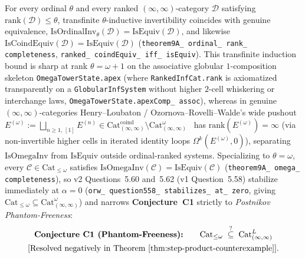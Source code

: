 \begin{theorem}[Ordinal-Rank Completeness and Stabilization of ORW Question~5.58 at $\alpha = 0$]\label{thm:ordinal-rank-completeness}%
%
%
For every ordinal $\theta$ and every ranked $(\infty, \infty)$-category $\mathcal{D}$ satisfying $\mathrm{rank}(\mathcal{D}) \le \theta$, transfinite $\theta$-inductive invertibility coincides with genuine equivalence, $\mathrm{IsOrdinalInv}_\theta(\mathcal{D}) = \mathrm{IsEquiv}(\mathcal{D})$, and likewise $\mathrm{IsCoindEquiv}(\mathcal{D}) = \mathrm{IsEquiv}(\mathcal{D})$ (\texttt{theorem9A\_ ordinal\_ rank\_ completeness}, \texttt{ranked\_ coindEquiv\_ iff\_ isEquiv}). This transfinite induction bound is sharp at rank $\theta = \omega + 1$ on the associative globular $1$-composition skeleton \texttt{OmegaTowerState.apex} (where \texttt{RankedInfCat.rank} is axiomatized transparently on a \texttt{GlobularInfSystem} without higher $2$-cell whiskering or interchange laws, \texttt{OmegaTowerState.apexComp\_ assoc}), whereas in genuine $(\infty, \infty)$-categories Henry--Loubaton / Ozornova--Rovelli--Walde's wide pushout $E^{(\omega)} := \bigsqcup_{n \ge 1,\, [1]} E^{(n)} \in \mathrm{Cat}^{\mathrm{coind}}_{(\infty,\infty)} \setminus \mathrm{Cat}^\omega_{(\infty,\infty)}$~\cite{HenryLoubaton25,ORW26} has $\mathrm{rank}(E^{(\omega)}) = \infty$ (via non-invertible higher cells in iterated identity loops $\Omega^k(E^{(\omega)}, 0)$), separating $\mathrm{IsOmegaInv}$ from $\mathrm{IsEquiv}$ outside ordinal-ranked systems. Specializing to $\theta = \omega$, every $\mathcal{C} \in \mathrm{Cat}_{\le \omega}$ satisfies $\mathrm{IsOmegaInv}(\mathcal{C}) = \mathrm{IsEquiv}(\mathcal{C})$ (\texttt{theorem9A\_ omega\_ completeness}), so v2 Questions~5.60 and~5.62 (v1 Question~5.58) stabilize immediately at $\alpha = 0$ (\texttt{orw\_ question558\_ stabilizes\_ at\_ zero}, giving $\mathrm{Cat}_{\le \omega} \subseteq \mathrm{Cat}^\omega_{(\infty, \infty)}$) and narrows \textbf{Conjecture~C1} strictly to \emph{Postnikov Phantom-Freeness}:
\begin{gather*}
  \text{\textbf{Conjecture~C1 (Phantom-Freeness):}} \qquad \mathrm{Cat}_{\le \omega} \;\stackrel{?}{\subseteq}\; \mathrm{Cat}^L_{(\infty, \infty)} \\
  \text{[Resolved negatively in Theorem~\ref{thm:step-product-counterexample}].}
\end{gather*}
\end{theorem}

